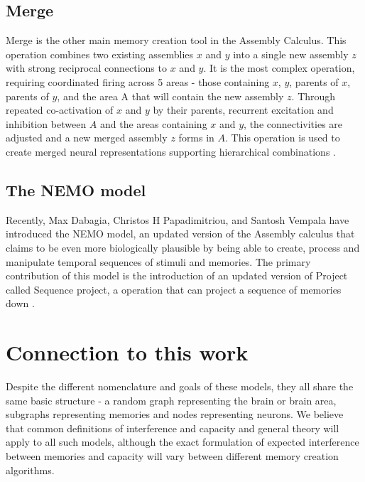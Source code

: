 \subsection{Merge}

Merge is the other main memory creation tool in the Assembly Calculus. This operation combines two existing assemblies $x$ and $y$ into a single new assembly $z$ with strong reciprocal connections to $x$ and $y$. It is the most complex operation, requiring coordinated firing across 5 areas - those containing $x$, $y$, parents of $x$, parents of $y$, and the area A that will contain the new assembly $z$. Through repeated co-activation of $x$ and $y$ by their parents, recurrent excitation and inhibition between $A$ and the areas containing $x$ and $y$, the connectivities are adjusted and a new merged assembly $z$ forms in $A$. This operation is used to create merged neural representations supporting hierarchical combinations \cite{papadimitriou2020brain}.

\subsection{The NEMO model}

Recently, Max Dabagia, Christos H Papadimitriou, and Santosh Vempala have introduced the NEMO model, an updated version of the Assembly calculus that claims to be even more biologically plausible by being able to create, process and manipulate temporal sequences of stimuli and memories. The primary contribution of this model is the introduction of an updated version of Project called Sequence project, a operation that can project a sequence of memories down \cite{dabagia2023computation}.  

\section{Connection to this work}

Despite the different nomenclature and goals of these models, they all share the same basic structure - a random graph representing the brain or brain area, subgraphs representing memories and nodes representing neurons. We believe that common definitions of interference and capacity and general theory will apply to all such models, although the exact formulation of expected interference between memories and capacity will vary between different memory creation algorithms. 

